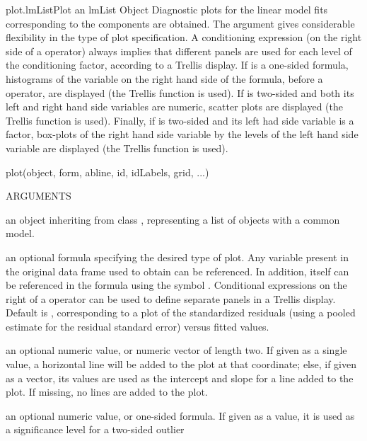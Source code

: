 \documentclass[pdftex]{article} \usepackage{url,graphicx}
\renewcommand{\Twiddle}{\mbox{\(\sim\)}}
\begin{document}
\begin{Helpfile}{plot.lmList}{Plot an lmList Object}
Diagnostic plots for the linear model fits corresponding to the
  components are obtained. The  argument gives
considerable flexibility in the type of  plot specification. A
conditioning expression (on the right side of a  \Co{|} operator)
always implies that different panels are used for  each level of the
conditioning factor, according to a Trellis  display. If 
is a one-sided formula, histograms of the  variable on the right hand
side of the formula, before a \Co{|}  operator, are displayed (the
Trellis function  is  used). If  is
two-sided and both its left and  right hand side variables are
numeric, scatter plots are displayed  (the Trellis function
 is used). Finally, if   is two-sided and its
left had side variable is a factor, box-plots of  the right hand side
variable by the levels of the left hand side  variable are displayed
(the Trellis function   is used).
\begin{Example}
plot(object, form, abline, id, idLabels, grid, ...)
\end{Example}
\begin{Argument}{ARGUMENTS}
\item[\Co{object:}]
an object inheriting from class , representing
a list of  objects with a common model.
\item[\Co{form:}]
an optional formula specifying the desired type of
plot. Any variable present in the original data frame used to obtain
 can be referenced. In addition,  itself
can be referenced in the formula using the symbol
. Conditional expressions on the right of a \Co{|}
operator can be used to define separate panels in a Trellis
display. Default is \Co{resid(., type = "pool") {\Twiddle} fitted(.)},
corresponding to a plot of the standardized residuals (using a pooled
estimate for the residual standard error) versus fitted values.
\item[\Co{abline:}]
an optional numeric value, or numeric vector of length
two. If given as a single value, a horizontal line will be added to the
plot at that coordinate; else, if given as a vector, its values are
used as the intercept and slope for a line added to the plot. If
missing, no lines are added to the plot.
\item[\Co{id:}]
an optional numeric value, or one-sided formula. If given as
a value, it is used as a significance level for a two-sided outlier

\end{Argument}
\end{Helpfile}
\end{document}
